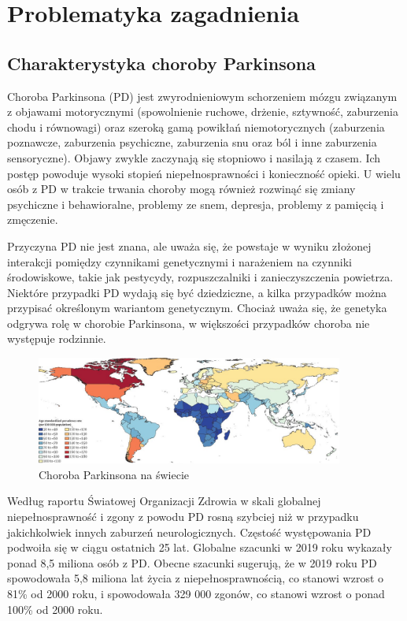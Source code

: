 \chapter{Problematyka zagadnienia}
\label{ch:problematyka}

\section{Charakterystyka choroby Parkinsona}
\label{sec:charakterystykaPD}

Choroba Parkinsona (PD) jest zwyrodnieniowym schorzeniem mózgu związanym z objawami motorycznymi (spowolnienie ruchowe,
drżenie, sztywność, zaburzenia chodu i równowagi) oraz szeroką gamą powikłań niemotorycznych (zaburzenia poznawcze,
zaburzenia psychiczne, zaburzenia snu oraz ból i inne zaburzenia sensoryczne).
Objawy zwykle zaczynają się stopniowo i nasilają z czasem.
Ich postęp powoduje wysoki stopień niepełnosprawności i konieczność opieki.
U wielu osób z PD w trakcie trwania choroby mogą również rozwinąć się zmiany psychiczne i behawioralne, problemy ze snem,
depresja, problemy z pamięcią i zmęczenie.


Przyczyna PD nie jest znana, ale uważa się, że powstaje w wyniku złożonej interakcji pomiędzy czynnikami genetycznymi i
narażeniem na czynniki środowiskowe, takie jak pestycydy, rozpuszczalniki i zanieczyszczenia powietrza.
Niektóre przypadki PD wydają się być dziedziczne, a kilka przypadków można przypisać określonym wariantom genetycznym.
Chociaż uważa się, że genetyka odgrywa rolę w chorobie Parkinsona, w większości przypadków choroba nie występuje rodzinnie\cite{National_Institute_on_Aging_2022}.

\begin{figure}[htbp]
	\centering
	\includegraphics[width=0.9\textwidth]{./img/map}
	\caption{Choroba Parkinsona na świecie \cite{global_PD}}
    \label{fig:PD_map}
\end{figure}

Według raportu Światowej Organizacji Zdrowia\cite{WHO} w skali globalnej niepełnosprawność i zgony z powodu PD
rosną szybciej niż w przypadku jakichkolwiek innych zaburzeń neurologicznych.
Częstość występowania PD podwoiła się w ciągu ostatnich 25 lat.
Globalne szacunki w 2019 roku wykazały ponad 8,5 miliona osób z PD.
Obecne szacunki sugerują, że w 2019 roku PD spowodowała 5,8 miliona lat życia z niepełnosprawnością, co
stanowi wzrost o 81\% od 2000 roku, i spowodowała 329 000 zgonów, co stanowi wzrost o ponad 100\% od 2000 roku.

